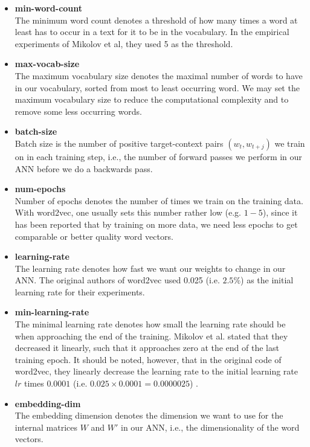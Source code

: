 \begin{itemize}
    \item \textbf{min-word-count} \\
        The minimum word count denotes a threshold of how many times a word at least has to occur in a text for it to be in the vocabulary. In the empirical experiments of Mikolov et al, they used 5 as the threshold.
    \item \textbf{max-vocab-size} \\
        The maximum vocabulary size denotes the maximal number of words to have in our vocabulary, sorted from most to least occurring word. We may set the maximum vocabulary size to reduce the computational complexity and to remove some less occurring words.
    \item \textbf{batch-size} \\
        Batch size is the number of positive target-context pairs $(w_t, w_{t+j})$ we train on in each training step, i.e., the number of forward passes we perform in our ANN before we do a backwards pass.
    \item \textbf{num-epochs} \\
        Number of epochs denotes the number of times we train on the training data. With word2vec, one usually sets this number rather low (e.g. $1-5$), since it has been reported that by training on more data, we need less epochs to get comparable or better quality word vectors.
    \item \textbf{learning-rate} \\
        The learning rate denotes how fast we want our weights to change in our ANN. The original authors of word2vec used 0.025 (i.e. $2.5\%$) as the initial learning rate for their experiments.
    \item \textbf{min-learning-rate} \\
        The minimal learning rate denotes how small the learning rate should be when approaching the end of the training. Mikolov et al. stated that they decreased it linearly, such that it approaches zero at the end of the last training epoch. It should be noted, however, that in the original code of word2vec, they linearly decrease the learning rate to the initial learning rate $lr$ times $0.0001$ (i.e. $0.025 \times 0.0001 = 0.0000025$) \cite[line 398]{Word2vecCCode}.
    \item \textbf{embedding-dim} \\
        The embedding dimension denotes the dimension we want to use for the internal matrices $W$ and $W'$ in our ANN, i.e., the dimensionality of the word vectors.

\end{itemize}
